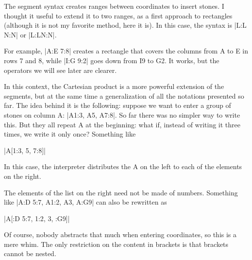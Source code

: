 \begin{codeexample}[width=6cm]
	\begin{goban}[label = {at = all}]
	\end{goban}
\end{codeexample}


The segment syntax creates ranges between coordinates to insert stones. I thought it useful to extend it to two ranges, as a first approach to rectangles (although it is not my favorite method, here it is). In this case, the syntax is |L:L N:N| or |L:LN:N|.

\begin{codeexample}[width=6cm]
	\begin{goban}[label = {at = all}]
	\end{goban}
\end{codeexample}

For example, |A:E 7:8| creates a rectangle that covers the columns from A to E in rows 7 and 8, while |I:G 9:2| goes down from I9 to G2. It works, but the operators we will see later are clearer.


	In this context, the Cartesian product is a more powerful extension of the segments, but at the same time a generalization of all the notations presented so far. The idea behind it is the following: suppose we want to enter a group of stones on column A: |A1:3, A5, A7:8|. So far there was no simpler way to write this. But they all repeat A at the beginning: what if, instead of writing it three times, we write it only once? Something like
	\begin{center}
		|A[1:3, 5, 7:8]|
	\end{center}
	In this case, the interpreter distributes the A on the left to each of the elements on the right.

	The elements of the list on the right need not be made of numbers. Something like |A:D 5:7, A1:2, A3, A:G9| can also be rewritten as
	\begin{center}
		|A[:D 5:7, 1:2, 3, :G9]|
	\end{center}
	Of course, nobody abstracts that much when entering coordinates, so this is a mere whim. The only restriction on the content in brackets is that brackets cannot be nested.

